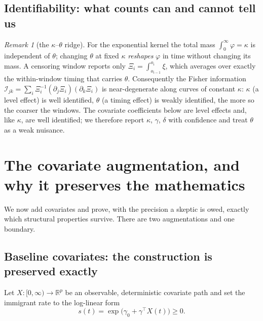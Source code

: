 \documentclass[11pt]{article}
\theoremstyle{plain}
\theoremstyle{definition}
\theoremstyle{remark}
\newtheorem*{remark}{Remark}
\newcommand{\R}{\mathbb{R}}\newcommand{\N}{\mathbb{N}}\newcommand{\E}{\mathbb{E}}
\begin{document}
\subsection{Identifiability: what counts can and cannot tell us}
\label{sec:identif}

\begin{remark}[the $\kappa$--$\theta$ ridge]
\label{rem:ridge}
For the exponential kernel the total mass $\int_0^\infty\varphi=\kappa$ is
independent of $\theta$; changing $\theta$ at fixed $\kappa$ \emph{reshapes}
$\varphi$ in time without changing its mass. A censoring window reports only
$\Xi_i=\int_{o_{i-1}}^{o_i}\xi$, which averages over exactly the within-window
timing that carries $\theta$. Consequently the Fisher information
$\mathcal I_{jk}=\sum_i\Xi_i^{-1}(\partial_j\Xi_i)(\partial_k\Xi_i)$ is
near-degenerate along curves of constant $\kappa$: $\kappa$ (a level effect) is
well identified, $\theta$ (a timing effect) is weakly identified, the more so the
coarser the windows. The covariate coefficients below are level effects and, like
$\kappa$, are well identified; we therefore report $\kappa$, $\gamma$, $\delta$
with confidence and treat $\theta$ as a weak nuisance.
\end{remark}

\section{The covariate augmentation, and why it preserves the mathematics}
\label{sec:augment}

We now add covariates and prove, with the precision a skeptic is owed, exactly
which structural properties survive. There are two augmentations and one
boundary.

\subsection{Baseline covariates: the construction is preserved exactly}

Let $X:[0,\infty)\to\R^p$ be an observable, deterministic covariate path and set
the immigrant rate to the log-linear form
\begin{equation}
s(t)=\exp\!\big(\gamma_0+\gamma^\top X(t)\big)\ge0.
\label{eq:basecov}
\end{equation}
\end{document}
